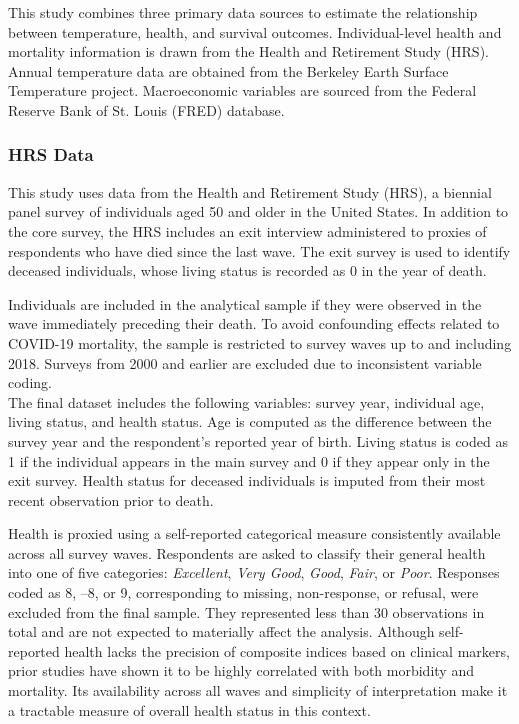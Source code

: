 \documentclass{article}
\begin{document}
This study combines three primary data sources to estimate the
relationship between temperature, health, and survival outcomes.
Individual-level health and mortality information is drawn from
the Health and Retirement Study (HRS).
Annual temperature data are obtained from the Berkeley Earth Surface Temperature project.
Macroeconomic variables are sourced from the Federal Reserve Bank of St. Louis (FRED) database.

\subsubsection{HRS Data}
This study uses data from the Health and Retirement Study (HRS), a biennial panel survey of individuals aged 50 and older in the United States. In addition to the core survey, the HRS includes an exit interview administered to proxies of respondents who have died since the last wave. The exit survey is used to identify deceased individuals, whose living status is recorded as 0 in the year of death.

Individuals are included in the analytical sample if they were observed in the wave immediately preceding their death. To avoid confounding effects related to COVID-19 mortality, the sample is restricted to survey waves up to and including 2018. Surveys from 2000 and earlier are excluded due to inconsistent variable coding.
\\

The final dataset includes the following variables: survey year, individual age, living status, and health status.
Age is computed as the difference between the survey year and the respondent’s reported year of birth.
Living status is coded as 1 if the individual appears in the main survey and 0 if they appear only in the exit survey.
Health status for deceased individuals is imputed from their most recent observation prior to death.

Health is proxied using a self-reported categorical measure consistently
available across all survey waves. Respondents are asked to classify their
general health into one of five categories: \textit{Excellent}, \textit{Very Good},
\textit{Good}, \textit{Fair}, or \textit{Poor}.
Responses coded as 8, –8, or 9, corresponding to missing, non-response, or refusal, 
were excluded from the final sample.
They represented less than 30 observations in total and are not expected to materially affect the analysis.
Although self-reported health lacks the precision of composite indices based on clinical markers,
prior studies have shown it to be highly correlated with both morbidity and mortality.
Its availability across all waves and simplicity of interpretation make
it a tractable measure of overall health status in this context.
\end{document}
